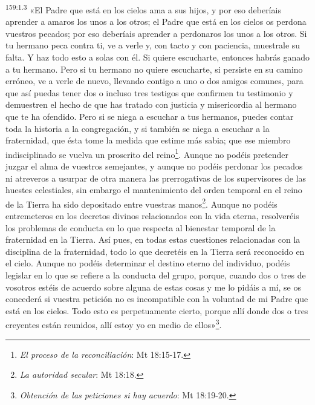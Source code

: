 \par
\textsuperscript{159:1.3} «El Padre que está en los cielos ama a sus hijos, y por eso deberíais aprender a amaros los unos a los otros; el Padre que está en los cielos os perdona vuestros pecados; por eso deberíais aprender a perdonaros los unos a los otros. Si tu hermano peca contra ti, ve a verle y, con tacto y con paciencia, muestrale su falta. Y haz todo esto a solas con él. Si quiere escucharte, entonces habrás ganado a tu hermano. Pero si tu hermano no quiere escucharte, si persiste en su camino erróneo, ve a verle de nuevo, llevando contigo a uno o dos amigos comunes, para que así puedas tener dos o incluso tres testigos que confirmen tu testimonio y demuestren el hecho de que has tratado con justicia y misericordia al hermano que te ha ofendido. Pero si se niega a escuchar a tus hermanos, puedes contar toda la historia a la congregación, y si también se niega a escuchar a la fraternidad, que ésta tome la medida que estime más sabia; que ese miembro indisciplinado se vuelva un proscrito del reino\footnote{\textit{El proceso de la reconciliación}: Mt 18:15-17.}. Aunque no podéis pretender juzgar el alma de vuestros semejantes, y aunque no podéis perdonar los pecados ni atreveros a usurpar de otra manera las prerrogativas de los supervisores de las huestes celestiales, sin embargo el mantenimiento del orden temporal en el reino de la Tierra ha sido depositado entre vuestras manos\footnote{\textit{La autoridad secular}: Mt 18:18.}. Aunque no podéis entremeteros en los decretos divinos relacionados con la vida eterna, resolveréis los problemas de conducta en lo que respecta al bienestar temporal de la fraternidad en la Tierra. Así pues, en todas estas cuestiones relacionadas con la disciplina de la fraternidad, todo lo que decretéis en la Tierra será reconocido en el cielo. Aunque no podéis determinar el destino eterno del individuo, podéis legislar en lo que se refiere a la conducta del grupo, porque, cuando dos o tres de vosotros estéis de acuerdo sobre alguna de estas cosas y me lo pidáis a mí, se os concederá si vuestra petición no es incompatible con la voluntad de mi Padre que está en los cielos. Todo esto es perpetuamente cierto, porque allí donde dos o tres creyentes están reunidos, allí estoy yo en medio de ellos»\footnote{\textit{Obtención de las peticiones si hay acuerdo}: Mt 18:19-20.}.


